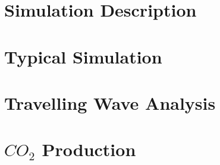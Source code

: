 \section{Simulation Description}


\section{Typical Simulation}


\section{Travelling Wave Analysis}


\section{$CO_2$ Production}

